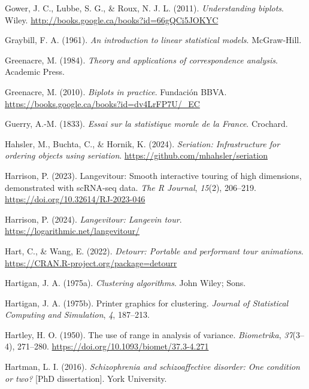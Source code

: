 \documentclass[
  letterpaper,
  10pt,
  krantz2]{krantz}
\newlength{\cslhangindent}
\newenvironment{CSLReferences}[2] %
 {\begin{list}{}{%
  \setlength{\itemindent}{0pt}
  \setlength{\leftmargin}{0pt}
  \setlength{\parsep}{0pt}
  \ifodd #1
   \setlength{\leftmargin}{\cslhangindent}
   \setlength{\itemindent}{-1\cslhangindent}
  \fi
  \setlength{\itemsep}{#2\baselineskip}}}
 {\end{list}}
\begin{document}
\begin{CSLReferences}{1}{0}
Gower, J. C., Lubbe, S. G., \& Roux, N. J. L. (2011).
\emph{Understanding biplots}. Wiley.
\url{http://books.google.ca/books?id=66gQCi5JOKYC}

Graybill, F. A. (1961). \emph{An introduction to linear statistical
models}. McGraw-Hill.

Greenacre, M. (1984). \emph{Theory and applications of correspondence
analysis}. Academic Press.

Greenacre, M. (2010). \emph{Biplots in practice}. Fundaci{ó}n BBVA.
\url{https://books.google.ca/books?id=dv4LrFP7U/_EC}

Guerry, A.-M. (1833). \emph{Essai sur la statistique morale de la
{France}}. Crochard.

Hahsler, M., Buchta, C., \& Hornik, K. (2024). \emph{Seriation:
Infrastructure for ordering objects using seriation}.
\url{https://github.com/mhahsler/seriation}

Harrison, P. (2023). Langevitour: Smooth interactive touring of high
dimensions, demonstrated with scRNA-seq data. \emph{The R Journal},
\emph{15}(2), 206--219. \url{https://doi.org/10.32614/RJ-2023-046}

Harrison, P. (2024). \emph{Langevitour: Langevin tour}.
\url{https://logarithmic.net/langevitour/}

Hart, C., \& Wang, E. (2022). \emph{Detourr: Portable and performant
tour animations}. \url{https://CRAN.R-project.org/package=detourr}

Hartigan, J. A. (1975a). \emph{Clustering algorithms}. John Wiley; Sons.

Hartigan, J. A. (1975b). Printer graphics for clustering. \emph{Journal
of Statistical Computing and Simulation}, \emph{4}, 187--213.

Hartley, H. O. (1950). The use of range in analysis of variance.
\emph{Biometrika}, \emph{37}(3--4), 271--280.
\url{https://doi.org/10.1093/biomet/37.3-4.271}

Hartman, L. I. (2016). \emph{Schizophrenia and schizoaffective disorder:
One condition or two?} {[}PhD dissertation{]}. York University.


\end{CSLReferences}
\end{document}
